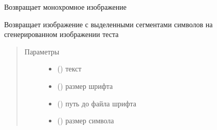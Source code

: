 \documentclass[letterpaper,10pt,russian]{sphinxmanual}
\begin{document}
\begin{fulllineitems}
\begin{fulllineitems}
\end{fulllineitems}


\begin{fulllineitems}
\label{\detokenize{OCRImage:image.OCRImage.get_grayscale_image}}
Возвращает монохромное изображение

\end{fulllineitems}


\begin{fulllineitems}
\label{\detokenize{OCRImage:image.OCRImage.get_text_profiled_image}}
Возвращает изображение с выделенными сегментами символов на сгенерированном изображении теста
\begin{quote}\begin{description}
\item[{Параметры}] \leavevmode\begin{itemize}
\item {} 
 () \textendash{} текст

\item {} 
 () \textendash{} размер шрифта

\item {} 
 () \textendash{} путь до файла шрифта

\item {} 
 () \textendash{} размер символа


\end{itemize}
\end{description}
\end{quote}
\end{fulllineitems}
\end{fulllineitems}
\end{document}
